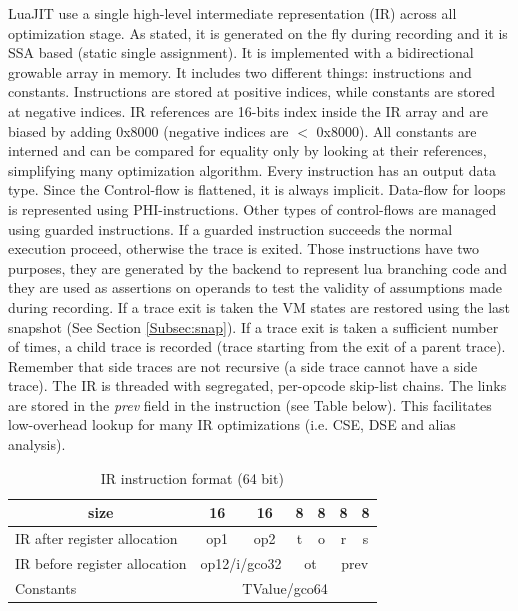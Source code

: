 LuaJIT use a single high-level intermediate representation (IR) across all
optimization stage. As stated, it is generated on the fly during recording and
it is SSA based (static single assignment). It is implemented with a
bidirectional growable array in memory. It includes two different things:
instructions and constants. Instructions are stored at positive indices, while
constants are stored at negative indices. IR references are 16-bits index inside
the IR array and are biased by adding 0x8000 (negative indices are $<$ 0x8000).
All constants are interned and can be compared for equality only by looking at
their references, simplifying many optimization algorithm. Every instruction has
an output data type. Since the Control-flow is flattened, it is always implicit.
Data-flow for loops is represented using PHI-instructions. Other types of
control-flows are managed using guarded instructions. If a guarded instruction
succeeds the normal execution proceed, otherwise the trace is exited. Those
instructions have two purposes, they are generated by the backend to represent
lua branching code and they are used as assertions on operands to test the
validity of assumptions made during recording. If a trace exit is taken the VM
states are restored using the last snapshot (See Section \ref{Subsec:snap}). If a trace exit is taken a
sufficient number of times, a child trace is recorded
(trace starting from the exit of a parent trace). Remember that side traces are
not recursive (a side trace cannot have a side trace). The IR is threaded with
segregated, per-opcode skip-list chains. The links are stored in the \emph{prev}
field in the instruction (see Table below). This facilitates low-overhead
lookup for many IR optimizations (i.e. CSE, DSE and alias analysis).

\begin{table}[H]
\centering
\caption{IR instruction format (64 bit)}
\label{tab:ir-format}
\begin{tabular}{|l|c|c|c|c|c|c|}
\hline
\multicolumn{1}{|c|}{size}    & 16              & 16              & 8          & 8          & 8           & 8           \\ \hline
IR after register allocation  & op1             & op2             & t          & o          & r           & s           \\ \hline
IR before register allocation & \multicolumn{2}{c|}{op12/i/gco32} & \multicolumn{2}{c|}{ot} & \multicolumn{2}{c|}{prev} \\ \hline
Constants                     & \multicolumn{6}{c|}{TValue/gco64}                                                       \\ \hline
\end{tabular}
\end{table}

